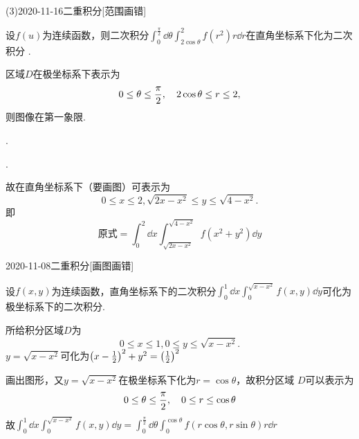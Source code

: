\documentclass{ctexart}
\begin{document}
\begin{mathques}(3){2020-11-16}{二重积分}[范围画错]
\begin{ques}
  设$f(u)$为连续函数，则二次积分$\int_{0}^{\frac{\pi}{2}}\dd
  \theta\int_{2\cos\theta}^{2}f(r^2)r\dd r$在直角坐标系下化为二次积分
  \mathblank.
\end{ques}
\begin{solu}

  区域$D$在极坐标系下表示为
  \[
  0 \le \theta \le \frac{\pi}{2}\qc 2\cos\theta \le r \le 2,
  \]
  则图像在第一象限.

  .

  .

  故在直角坐标系下（要画图）可表示为
  \[
  0 \le x \le 2, \sqrt{2x - x^2} \le y \le \sqrt{4 - x^2}.
  \]
  即
  \[
    \text{原式} = \int_{0}^{2}\dd x\int_{\sqrt{2x - x^2}}^{\sqrt{4 - x^2}}
    f(x^2 + y^2) \dd y
  \]
\end{solu}
\end{mathques}

\begin{mathques}{2020-11-08}{二重积分}[画图画错]
\begin{ques}
  设$f(x, y)$为连续函数，直角坐标系下的二次积分$\int_{0}^{1}\dd x\int_{0}
  ^{\sqrt{x - x^2}}f(x, y)\dd y$可化为极坐标系下的二次积分\mathblank.
\end{ques}
\begin{solu}

  所给积分区域$D$为
  \[
  0 \le x \le 1, 0 \le y \le \sqrt{x - x^2}.
  \]
  $y = \sqrt{x - x^2}$可化为$\qty(x - \frac{1}{2})^2 + y^2 = \qty(\frac{1}{2})
  ^2$

  画出图形，又$y = \sqrt{x - x^2}$在极坐标系下化为$r = \cos\theta$，故积分区域
  $D$可以表示为
  \[
  0 \le \theta \le \frac{\pi}{2}\qc 0 \le r \le \cos\theta
  \]
  故$\int_{0}^{1}\dd x\int_{0}^{\sqrt{x - x^2}}f(x, y)\dd y = \int_{0}
  ^{\frac{\pi}{2}}\dd \theta\int_{0}^{\cos\theta} f(r\cos\theta, r\sin\theta)
  r\dd r$
\end{solu}
\end{mathques}
\end{document}
